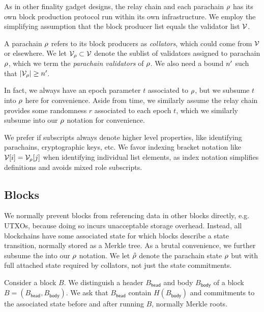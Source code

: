 As in other finality gadget designs, the relay chain and each parachain $\rho$ has its own block production protocol run within its own infrastructure.  We employ the simplifying assumption that the block producer list equals the validator list $\mathcal{V}$.  


A parachain $\rho$ refers to its block producers as {\em collators}, which could come from $\mathcal{V}$ or elsewhere.  We let $\mathcal{V}_{\rho} \subset \mathcal{V}$ denote the sublist of validators assigned to parachain $\rho$, which we term the {\em parachain validators} of $\rho$.  We also need a bound $n'$ such that $|\mathcal{V}_{\rho}| \ge n'$.

In fact, we always have an epoch parameter $t$ associated to $\rho$, but we subsume $t$ into $\rho$ here for convenience.  Aside from time, we similarly assume the relay chain provides some randomness $r$ associated to each epoch $t$, which we similarly subsume into our $\rho$ notation for convenience.

We prefer if subscripts always denote higher level properties, like identifying parachains, cryptographic keys, etc.  We favor indexing bracket notation like $\mathcal{V}[i] = \mathcal{V}_{\rho}[j]$ when identifying individual list elements, as index notation simplifies definitions and avoids mixed role subscripts. 

\subsection{Blocks}

We normally prevent blocks from referencing data in other blocks directly, e.g. UTXOs, because doing so incurs unacceptable storage overhead.  Instead, all blockchains have some associated state for which blocks describe a state transition, normally stored as a Merkle tree.  As a brutal convenience, we further subsume the  into our $\rho$ notation.  We let $\hat{\rho}$ denote the parachain state $\rho$ but with full attached state required by collators, not just the state commitments. 

Consider a block $B$.  We distinguish a header $B_{\mathsf{head}}$ and body $B_{\mathsf{body}}$ of a block $B = (B_{\mathsf{head}},B_{\mathsf{body}})$.  We ask that $B_{\mathsf{head}}$ contain $H(B_{\mathsf{body}})$ and commitments to the associated state before and after running $B$, normally Merkle roots.  

